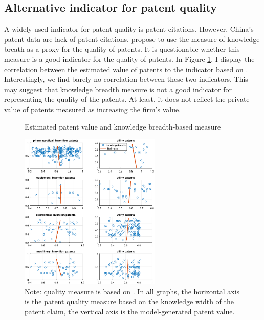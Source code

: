 \documentclass[11pt]{article}
\begin{document}
\subsection{Alternative indicator for patent quality}\label{pat_app}
A widely used indicator for patent quality is patent citations. However, China's patent data are lack of patent citations. \citet{Dang2015} propose to use the measure of knowledge breath as a proxy for the quality of patents. It is questionable whether this measure is a good indicator for the quality of patents. In Figure \ref{F5}, I display the correlation between the estimated value of patents to the indicator based on \citet{Dang2015}. Interestingly, we find barely no correlation between these two indicators. This may suggest that knowledge breadth measure is not a good indicator for representing the quality of the patents. At least, it does not reflect the private value of patents measured as increasing the firm's value.

    \begin{figure}[ht]
    \caption{Estimated patent value and knowledge breadth-based measure}
    \label{F5}
    \begin{centering}
    \includegraphics[width=0.6\textwidth]{Figs/patcorr.eps}
    \par\end{centering}
    \caption*{\small{}Note: quality measure is based on \citet{Dang2015}. In all graphs, the horizontal axis is the patent quality measure based on the knowledge width of the patent claim, the vertical axis is the model-generated patent value.}{\small \par}
    \end{figure}



\end{document}
